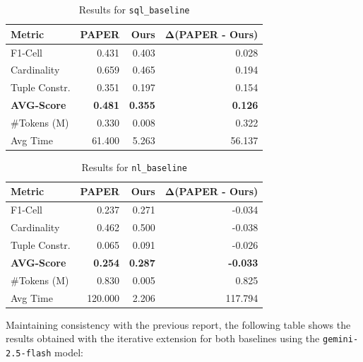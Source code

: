 \begin{table}[H]
    \centering
    \small
    \begin{tabular}{lrrr}
        \toprule
        \textbf{Metric} & \textbf{PAPER} & \textbf{Ours} & $\mathbf{\Delta}$(\textbf{PAPER} - \textbf{Ours}) \\
        \midrule
        F1-Cell & 0.431 & 0.403 & 0.028 \\
        Cardinality & 0.659 & 0.465 & 0.194 \\
        Tuple Constr. & 0.351 & 0.197 & 0.154 \\
        \textbf{AVG-Score} & \textbf{0.481} & \textbf{0.355} & \textbf{0.126} \\
        \#Tokens (M) & 0.330 & 0.008 & 0.322 \\
        Avg Time & 61.400 & 5.263 & 56.137 \\
        \bottomrule
    \end{tabular}
    \caption{Results for \texttt{sql\_baseline}}
    \label{tab:sql_baseline}
\end{table}

\begin{table}[H]
    \centering
    \small
    \begin{tabular}{lrrr}
        \toprule
        \textbf{Metric} & \textbf{PAPER} & \textbf{Ours} & $\mathbf{\Delta}$(\textbf{PAPER} - \textbf{Ours}) \\
        \midrule
        F1-Cell & 0.237 & 0.271 & -0.034 \\
        Cardinality & 0.462 & 0.500 & -0.038 \\
        Tuple Constr. & 0.065 & 0.091 & -0.026 \\
        \textbf{AVG-Score} & \textbf{0.254} & \textbf{0.287} & \textbf{-0.033} \\
        \#Tokens (M) & 0.830 & 0.005 & 0.825 \\
        Avg Time & 120.000 & 2.206 & 117.794 \\
        \bottomrule
    \end{tabular}
    \caption{Results for \texttt{nl\_baseline}}
    \label{tab:nl_baseline}
\end{table}

Maintaining consistency with the previous report, the following table shows the results obtained with the iterative extension for both baselines using the \texttt{gemini-2.5-flash} model:


